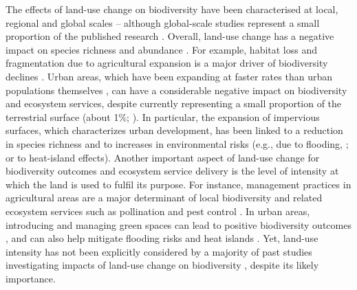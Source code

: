 The effects of land-use change on biodiversity have been characterised at local, regional and global scales – although global-scale studies represent a small proportion of the published research \citep{Davison2021}. Overall, land-use change  has a negative impact on species richness and abundance \citep{Newbold2015}. For example, habitat loss and fragmentation due to agricultural expansion is a major driver of biodiversity declines \citep{Foley2005}.  Urban areas, which have been expanding at faster rates than urban populations themselves \citep{Seto2010}, can have a considerable negative impact on biodiversity and ecosystem services, despite currently representing a small proportion of the terrestrial surface (about 1\%; \citet{Goldewijk2017}). In particular, the expansion of impervious surfaces, which characterizes urban development, has been linked to a reduction in species richness \citep{Souza2019, Yan2019} and to increases in environmental risks (e.g., due to flooding, \citet{Hou2022}; or to heat-island effects). Another important aspect of land-use change for biodiversity outcomes and ecosystem service delivery is the level of intensity at which the land is used to fulfil its purpose. For instance, management practices in agricultural areas are a major determinant of local biodiversity and related ecosystem services such as pollination and pest control \citep{Foley2005, Kehoe2015a, Millard2021}. In urban areas, introducing and managing green spaces can lead to positive biodiversity outcomes \citep{Ives2016, Aronson2017}, and can also help mitigate flooding risks and heat islands \citep{Livesley2016}. Yet, land-use intensity has not been explicitly considered by a majority of past studies investigating impacts of land-use change on biodiversity \citep{Davison2021, Dullinger2021}, despite its likely importance.

